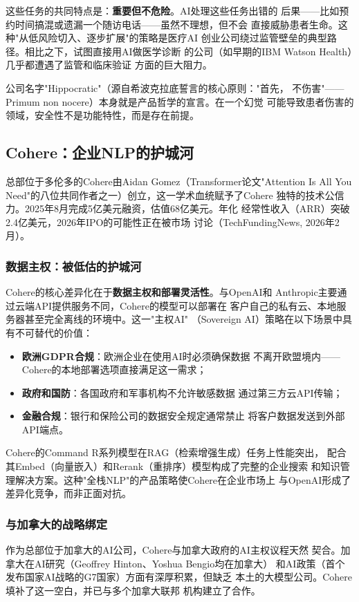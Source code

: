 这些任务的共同特点是：\textbf{重要但不危险}。AI处理这些任务出错的
后果——比如预约时间搞混或遗漏一个随访电话——虽然不理想，但不会
直接威胁患者生命。这种"从低风险切入、逐步扩展"的策略是医疗AI
创业公司绕过监管壁垒的典型路径。相比之下，试图直接用AI做医学诊断
的公司（如早期的IBM Watson Health）几乎都遭遇了监管和临床验证
方面的巨大阻力。

公司名字"Hippocratic"（源自希波克拉底誓言的核心原则："首先，
不伤害"——Primum non nocere）本身就是产品哲学的宣言。在一个幻觉
可能导致患者伤害的领域，安全性不是功能特性，而是存在前提。

\subsection{Cohere：企业NLP的护城河}
\label{subsec:cohere}

总部位于多伦多的Cohere由Aidan Gomez（Transformer论文"Attention Is
All You Need"的八位共同作者之一）创立，这一学术血统赋予了Cohere
独特的技术公信力。2025年8月完成5亿美元融资，估值68亿美元。年化
经常性收入（ARR）突破2.4亿美元，2026年IPO的可能性正在被市场
讨论（TechFundingNews, 2026年2月）。

\subsubsection{数据主权：被低估的护城河}
Cohere的核心差异化在于\textbf{数据主权和部署灵活性}。与OpenAI和
Anthropic主要通过云端API提供服务不同，Cohere的模型可以部署在
客户自己的私有云、本地服务器甚至完全离线的环境中。这一"主权AI"
（Sovereign AI）策略在以下场景中具有不可替代的价值：
\begin{itemize}
  \item \textbf{欧洲GDPR合规}：欧洲企业在使用AI时必须确保数据
    不离开欧盟境内——Cohere的本地部署选项直接满足这一需求；
  \item \textbf{政府和国防}：各国政府和军事机构不允许敏感数据
    通过第三方云API传输；
  \item \textbf{金融合规}：银行和保险公司的数据安全规定通常禁止
    将客户数据发送到外部API端点。
\end{itemize}

Cohere的Command R系列模型在RAG（检索增强生成）任务上性能突出，
配合其Embed（向量嵌入）和Rerank（重排序）模型构成了完整的企业搜索
和知识管理解决方案。这种"全栈NLP"的产品策略使Cohere在企业市场上
与OpenAI形成了差异化竞争，而非正面对抗。

\subsubsection{与加拿大的战略绑定}
作为总部位于加拿大的AI公司，Cohere与加拿大政府的AI主权议程天然
契合。加拿大在AI研究（Geoffrey Hinton、Yoshua Bengio均在加拿大）
和AI政策（首个发布国家AI战略的G7国家）方面有深厚积累，但缺乏
本土的大模型公司。Cohere填补了这一空白，并已与多个加拿大联邦
机构建立了合作。

